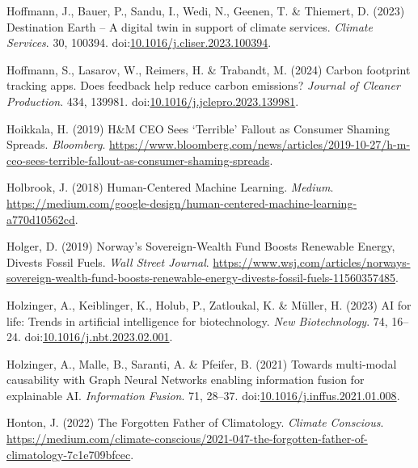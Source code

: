 \documentclass[
  letterpaper,
  DIV=11,
  numbers=noendperiod]{scrartcl}
\newlength{\cslhangindent}
\newenvironment{CSLReferences}[2] %
 {\begin{list}{}{%
  \setlength{\itemindent}{0pt}
  \setlength{\leftmargin}{0pt}
  \setlength{\parsep}{0pt}
  \ifodd #1
   \setlength{\leftmargin}{\cslhangindent}
   \setlength{\itemindent}{-1\cslhangindent}
  \fi
  \setlength{\itemsep}{#2\baselineskip}}}
 {\end{list}}
\begin{document}
\begin{CSLReferences}{0}{1}
Hoffmann, J., Bauer, P., Sandu, I., Wedi, N., Geenen, T. \& Thiemert, D.
(2023) Destination {Earth} -- {A} digital twin in support of climate
services. \emph{Climate Services}. 30, 100394.
doi:\href{https://doi.org/10.1016/j.cliser.2023.100394}{10.1016/j.cliser.2023.100394}.

Hoffmann, S., Lasarov, W., Reimers, H. \& Trabandt, M. (2024) Carbon
footprint tracking apps. {Does} feedback help reduce carbon emissions?
\emph{Journal of Cleaner Production}. 434, 139981.
doi:\href{https://doi.org/10.1016/j.jclepro.2023.139981}{10.1016/j.jclepro.2023.139981}.

Hoikkala, H. (2019) H\&{M CEO Sees} {`{Terrible}'} {Fallout} as
{Consumer Shaming Spreads}. \emph{Bloomberg}.
\url{https://www.bloomberg.com/news/articles/2019-10-27/h-m-ceo-sees-terrible-fallout-as-consumer-shaming-spreads}.

Holbrook, J. (2018) Human-{Centered Machine Learning}. \emph{Medium}.
\url{https://medium.com/google-design/human-centered-machine-learning-a770d10562cd}.

Holger, D. (2019) Norway's {Sovereign-Wealth Fund Boosts Renewable
Energy}, {Divests Fossil Fuels}. \emph{Wall Street Journal}.
\url{https://www.wsj.com/articles/norways-sovereign-wealth-fund-boosts-renewable-energy-divests-fossil-fuels-11560357485}.

Holzinger, A., Keiblinger, K., Holub, P., Zatloukal, K. \& Müller, H.
(2023) {AI} for life: {Trends} in artificial intelligence for
biotechnology. \emph{New Biotechnology}. 74, 16--24.
doi:\href{https://doi.org/10.1016/j.nbt.2023.02.001}{10.1016/j.nbt.2023.02.001}.

Holzinger, A., Malle, B., Saranti, A. \& Pfeifer, B. (2021) Towards
multi-modal causability with {Graph Neural Networks} enabling
information fusion for explainable {AI}. \emph{Information Fusion}. 71,
28--37.
doi:\href{https://doi.org/10.1016/j.inffus.2021.01.008}{10.1016/j.inffus.2021.01.008}.

Honton, J. (2022) The {Forgotten Father} of {Climatology}. \emph{Climate
Conscious}.
\url{https://medium.com/climate-conscious/2021-047-the-forgotten-father-of-climatology-7c1e709bfcec}.


\end{CSLReferences}
\end{document}
